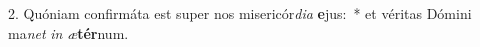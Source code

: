 2. Quóniam confirmáta est super nos misericór\textit{di}\textit{a} \textbf{e}jus:~*  et véritas Dómini ma\textit{net} \textit{in} \textit{æ}\textbf{tér}num.\

